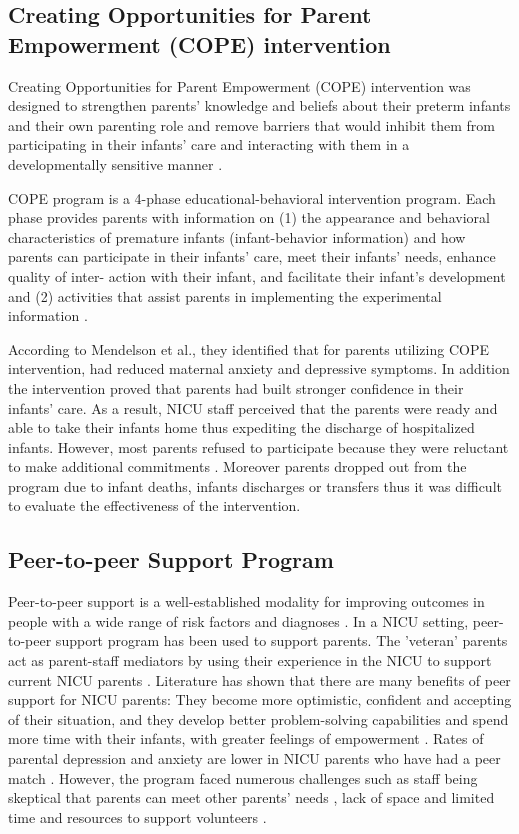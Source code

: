 \subsection{Creating Opportunities for Parent Empowerment (COPE) intervention}
Creating Opportunities for Parent Empowerment (COPE) intervention was designed to strengthen parents’ knowledge and beliefs about their preterm infants and their own parenting role and remove barriers that would inhibit them from participating in their infants’ care and interacting with them in a developmentally sensitive manner  \citep{Mendelson2017, Melnyk2006}. 

COPE program is a 4-phase educational-behavioral intervention program. Each phase provides parents with information on (1) the appearance and behavioral characteristics of premature infants (infant-behavior information) and how parents can participate in their infants’ care, meet their infants’ needs, enhance quality of inter- action with their infant, and facilitate their infant’s development and (2) activities that assist parents in implementing the experimental information \citep{Melnyk2004}.

According to Mendelson et al., \citep{Mendelson2017} they identified that for parents utilizing COPE intervention, had reduced maternal anxiety and depressive symptoms. In addition the intervention proved that parents had built stronger confidence in their infants' care. As a result, NICU staff perceived that the parents were ready and able to take their infants home thus expediting the discharge of hospitalized infants. However, most parents refused to participate because they were reluctant to make additional commitments \citep{Mendelson2017}. Moreover parents dropped out from the program due to infant deaths, infants discharges or transfers thus it was difficult to evaluate the  effectiveness of the intervention.

\subsection{Peer-to-peer Support Program}
 Peer-to-peer support is a well-established modality for improving outcomes in people with a wide range of risk factors and diagnoses \citep{Humphreys2004, Dixon2014}. In a NICU setting, peer-to-peer support program has been used to support parents. The 'veteran' parents  act as parent-staff mediators by using their experience in the NICU to support current NICU parents \citep{Sorkin2016}. Literature has shown that there are many benefits of peer support for NICU parents: They become more optimistic, confident and accepting of their situation, and they develop better problem-solving capabilities and spend more time with their infants, with greater feelings of empowerment \citep{Hall2015, Sorkin2016}. Rates of parental depression and anxiety are lower in NICU parents who have had a peer match \citep{Sorkin2016, Hall2016}. However, the program faced numerous challenges such as staff being skeptical that parents can meet other parents' needs , lack of space and limited time and resources to support volunteers \citep{Hall2015c}.

